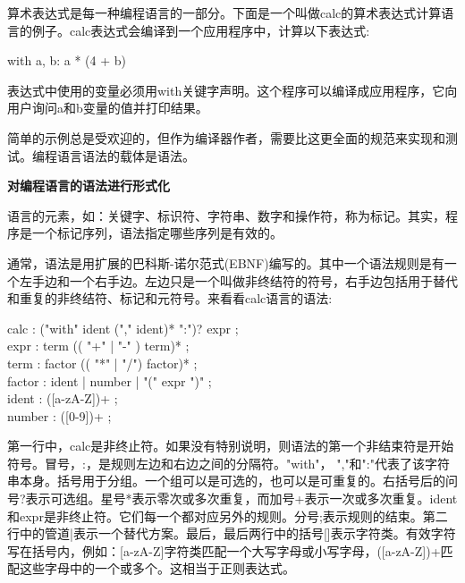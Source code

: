 算术表达式是每一种编程语言的一部分。下面是一个叫做calc的算术表达式计算语言的例子。calc表达式会编译到一个应用程序中，计算以下表达式:\par

\begin{tcolorbox}[colback=white,colframe=black]
with a, b: a * (4 + b)
\end{tcolorbox}

表达式中使用的变量必须用with关键字声明。这个程序可以编译成应用程序，它向用户询问a和b变量的值并打印结果。\par

简单的示例总是受欢迎的，但作为编译器作者，需要比这更全面的规范来实现和测试。编程语言语法的载体是语法。\par

\hspace*{\fill} \par %
\textbf{对编程语言的语法进行形式化}

语言的元素，如：关键字、标识符、字符串、数字和操作符，称为标记。其实，程序是一个标记序列，语法指定哪些序列是有效的。\par

通常，语法是用扩展的巴科斯-诺尔范式(EBNF)编写的。其中一个语法规则是有一个左手边和一个右手边。左边只是一个叫做非终结符的符号，右手边包括用于替代和重复的非终结符、标记和元符号。来看看calc语言的语法:\par

\begin{tcolorbox}[colback=white,colframe=black]
calc : ("with" ident ("," ident)* ":")? expr ; \\
expr : term (( "+" | "-" ) term)* ; \\
term : factor (( "*" | "/") factor)* ; \\
factor : ident | number | "(" expr ")" ; \\
ident : ([a-zA-Z])+ ; \\
number : ([0-9])+ ; 
\end{tcolorbox}

第一行中，calc是非终止符。如果没有特别说明，则语法的第一个非结束符是开始符号。冒号，:，是规则左边和右边之间的分隔符。"with"， ","和":"代表了该字符串本身。括号用于分组。一个组可以是可选的，也可以是可重复的。右括号后的问号?表示可选组。星号*表示零次或多次重复，而加号+表示一次或多次重复。ident和expr是非终止符。它们每一个都对应另外的规则。分号;表示规则的结束。第二行中的管道|表示一个替代方案。最后，最后两行中的括号[]表示字符类。有效字符写在括号内，例如：[a-zA-Z]字符类匹配一个大写字母或小写字母，([a-zA-Z])+匹配这些字母中的一个或多个。这相当于正则表达式。\par

